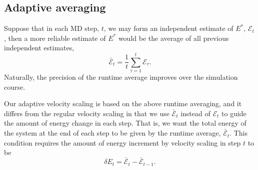 \documentclass[reprint]{revtex4-1}
\begin{document}
\subsection{Adaptive averaging}



Suppose that in each MD step, $t$,
we may form an independent estimate of $E^*$,
$\mathcal E_t$,
then a more reliable estimate of $E^*$
would be the average of
all previous independent estimates,
%
\begin{equation}
  \bar{\mathcal E}_t
  =
  \frac 1 t
  \sum_{\tau = 1}^t
    \mathcal E_\tau
  .
  \label{eq:Epsave}
\end{equation}
%
Naturally, the precision of the runtime average
improves over the simulation course.



Our adaptive velocity scaling is based on
the above runtime averaging,
and it differs from the regular velocity scaling
in that we use $\bar{\mathcal E}_t$
instead of $\mathcal E_t$
to guide the amount of energy change in each step.
%
That is, we want
the total energy of the system
at the end of each step
to be given by
the runtime average, $\bar{\mathcal E}_t$.
%
This condition requires the amount of energy increment
by velocity scaling in step $t$ to be
%
\begin{equation}
  \delta E_t
  =
  \bar{\mathcal E}_t - \bar{\mathcal E}_{t - 1}
  .
  \label{eq:dE_adaptive}
\end{equation}
\end{document}

